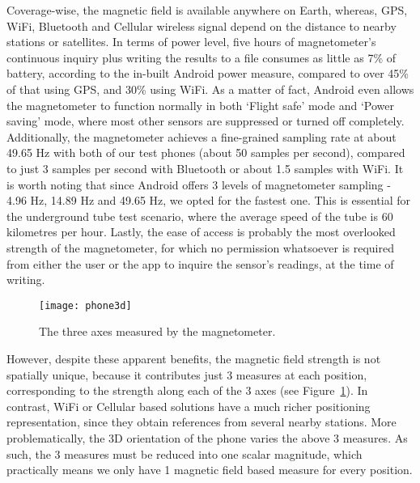 \documentclass[conference]{IEEEtran}
\begin{document}
Coverage-wise, the magnetic field is available anywhere on Earth, whereas, GPS, WiFi, Bluetooth and Cellular wireless signal depend on the distance to nearby stations or satellites. In terms of power level, five hours of magnetometer's continuous inquiry plus writing the results to a file consumes as little as 7\% of battery, according to the in-built Android power measure, compared to over 45\% of that using GPS, and 30\% using WiFi. As a matter of fact, Android even allows the magnetometer to function normally in both `Flight safe' mode and `Power saving' mode, where most other sensors are suppressed or turned off completely. Additionally, the magnetometer achieves a fine-grained sampling rate at about 49.65 Hz with both of our test phones (about 50 samples per second), compared to just 3 samples per second with Bluetooth or about 1.5 samples with WiFi. It is worth noting that since Android offers 3 levels of magnetometer sampling - 4.96 Hz, 14.89 Hz and 49.65 Hz, we opted for the fastest one. This is essential for the underground tube test scenario, where the average speed of the tube is 60 kilometres per hour. Lastly, the ease of access is probably the most overlooked strength of the magnetometer, for which no permission whatsoever is required from either the user or the app to inquire the sensor's readings, at the time of writing.
\begin{figure}[!t]
	\centering
	\texttt{[image: phone3d]}
	\caption{The three axes measured by the magnetometer.}
	\label{phone3d}
\end{figure}

However, despite these apparent benefits, the magnetic field strength is not spatially unique, because it contributes just 3 measures at each position, corresponding to the strength along each of the 3 axes (see Figure~\ref{phone3d}). In contrast, WiFi or Cellular based solutions have a much richer positioning representation, since they obtain references from several nearby stations. More problematically, the 3D orientation of the phone varies the above 3 measures. As such, the 3 measures must be reduced into one scalar magnitude, which practically means we only have 1 magnetic field based measure for every position.
\end{document}
